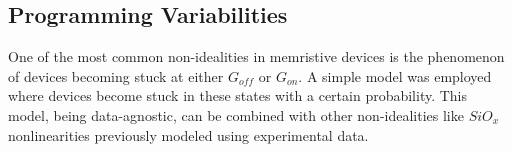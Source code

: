 \subsection{Programming Variabilities}


\noindent One of the most common non-idealities in memristive devices is the phenomenon of devices becoming stuck at either $G_{off}$ or $G_{on}$. A simple model was employed where devices become stuck in these states with a certain probability. This model, being data-agnostic, can be combined with other non-idealities like $SiO_x$ nonlinearities previously modeled using experimental data.\\





